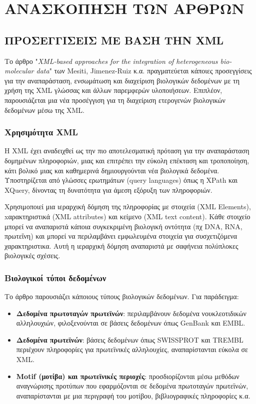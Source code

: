 \chapter{ΑΝΑΣΚΟΠΗΣΗ ΤΩΝ ΑΡΘΡΩΝ}

\section{ΠΡΟΣΕΓΓΙΣΕΙΣ ΜΕ ΒΑΣΗ ΤΗΝ XML}
    Το άρθρο "\textit{XML-based approaches for the integration of heterogeneous bio-molecular data}" των Mesiti, Jimenez-Ruiz κ.α. πραγματεύεται κάποιες προσεγγίσεις για την αναπαράσταση, ενσωμάτωση και διαχείριση βιολογικών δεδομένων με τη χρήση της XML γλώσσας και άλλων παρεμφερών υλοποιήσεων.
    Επιπλέον, παρουσιάζεται μια νέα προσέγγιση για τη διαχείριση ετερογενών βιολογικών δεδομένων μέσω της XML. \cite{XMLbasedApproaches}
    
    \subsection{Χρησιμότητα XML}
        Η XML έχει αναδειχθεί ως την πιο αποτελεσματική πρόταση για την αναπαράσταση δομημένων πληροφοριών, μιας και επιτρέπει την εύκολη επέκταση και τροποποίηση, κάτι βολικό μιας και καθημερινά δημιουργούνται νέα βιολογικά δεδομένα.
        Υποστηρίζεται από γλώσσες ερωτημάτων (query languages) όπως η XPath και XQuery, δίνοντας τη δυνατότητα για άμεση εξόρυξη των πληροφοριών.

        Χρησιμοποιεί μια ιεραρχική δόμηση της πληροφορίας με στοιχεία (XML Elements), xαρακτηριστικά (XML attributes) και κείμενο (XML text content).
        Κάθε στοιχείο μπορεί να αναπαριστά κάποια συγκεκριμένη βιολογική οντότητα (πχ DNA, RNA, πρωτεΐνη) και μπορεί να περιλαμβάνει εμφωλευμένα στοιχεία για συσχετιζόμενα χαρακτηριστικα.
        Αυτή η ιεραρχική δόμηση αναπαριστά με σαφήνεια πολύπλοκες βιολογικές σχέσεις.


    \subsection{Βιολογικοί τύποι δεδομένων}
        Το άρθρο παρουσιάζει κάποιους τύπους βιολογικών δεδομένων. Για παράδειγμα:
    \begin{itemize}[label={\tiny \blacksquare}]
        \vspace{-10pt}
        \item \textbf{Δεδομένα πρωτοταγών πρωτεϊνών}: περιλαμβάνουν δεδομένα νουκλεοτιδικών αλληλουχιών, φιλοξενούνται σε βάσεις δεδομένων όπως GenBank και EMBL.
        \item \textbf{Δεδομένα πρωτεϊνών}: βάσεις δεδομένων όπως SWISSPROT και TREMBL περιέχουν πληροφορίες για πρωτεϊνικές αλληλουχίες, αναπαρίστανται εύκολα σε XML.
        \item \textbf{Motif (μοτίβα) και πρωτεϊνικές περιοχές}: προσδιορίζονται μέσω μεθόδων αναγνώρισης προτύπων που εφαρμόζονται σε δεδομένα πρωτοταγών πρωτεϊνών, αναπαρίστανται με μια περιγραφή του μοτίβου, βιβλιογραφικές πληροφορίες κ.α.
    \end{itemize}

